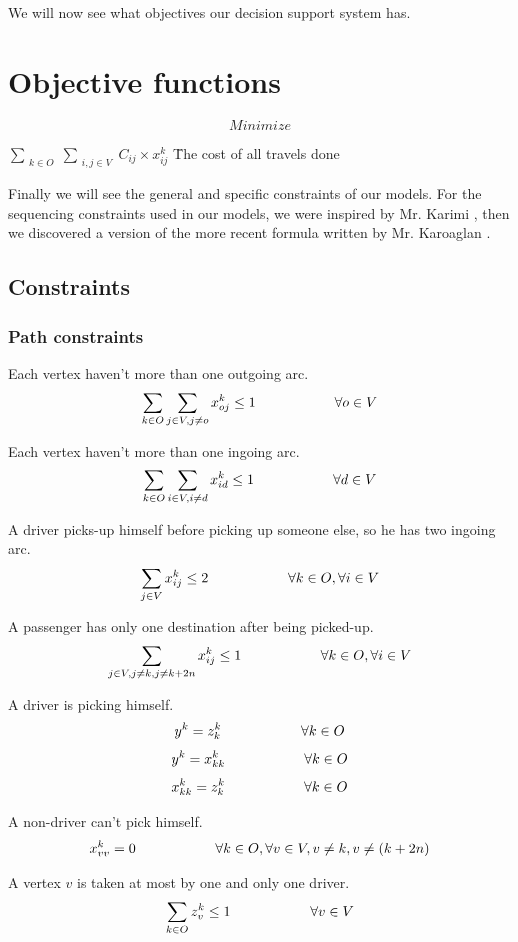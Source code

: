 \documentclass[12pt, a4paper, twoside]{memoir}
\newcommand\tab[1][1cm]{\hspace*{#1}}
\begin{document}
{	We will now see what objectives our decision support system has. 
	
	\section{Objective functions}
	\[ Minimize \] 
	\begin{tabbing}
		$ \sum_{\substack{k\in O}}\sum_{\substack{i, j \in V}} C_{ij} \times x^{k}_{ij}$ \tab \tab \= The cost of all travels done \\
	\end{tabbing}
	
	Finally we will see the general and specific constraints of our models. For the sequencing constraints used in our models, we were inspired by Mr. Karimi \cite{karaoglanmemetic2015}, then we discovered a version of the more recent formula written by Mr. Karoaglan \cite{karimicapacitated2018}.
	
	\subsection{Constraints}
	\subsubsection{Path constraints}
	
	Each vertex haven't more than one outgoing arc.
	\[ \sum_{\substack{k\in O}}\sum_{\substack{j \in V, j\ne o}} x^{k}_{oj}\leq1 \tab \tab \forall o\in V \]
	
	Each vertex haven't more than one ingoing arc.
	\[ \sum_{\substack{k\in O}}\sum_{\substack{i \in V, i\ne d}} x^{k}_{id}\leq1 \tab \tab \forall d\in V \]
	
	A driver picks-up himself before picking up someone else, so he has two ingoing arc.
	\[ \sum_{\substack{j\in V}}x^{k}_{ij}\leq2\tab \tab \forall k\in O, \forall i\in V \]
	
	A passenger has only one destination after being picked-up.
	\[ \sum_{\substack{j\in V, j\ne k, j\ne k+2n}}x^{k}_{ij}\leq1\tab \tab \forall k\in O, \forall i\in V \]
	
	A driver is picking himself.
	\[ y^{k}=z^{k}_{k}\tab \tab \forall k\in O \]
	\[ y^{k}=x^{k}_{kk}\tab \tab \forall k\in O \]
	\[ x^{k}_{kk}=z^{k}_{k}\tab \tab \forall k\in O \]
	
	A non-driver can't pick himself.
	\[ x^{k}_{vv}=0 \tab \tab \forall k\in O, \forall v\in V, v\ne k, v\ne(k+2n)\]
	
	A vertex $v$ is taken at most by one and only one driver.
	\[ \sum_{\substack{k\in O}} z^{k}_{v}\leq1 \tab \tab \forall v\in V\]
	
}
\end{document}
